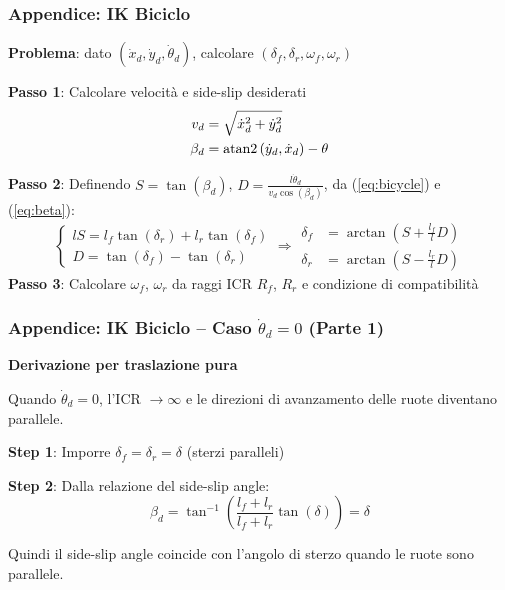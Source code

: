 \begin{frame}
    \frametitle{Appendice: IK Biciclo}
    \textbf{Problema}: dato $(\dot{x}_d, \dot{y}_d, \dot{\theta}_d)$, calcolare $(\delta_f, \delta_r, \omega_f, \omega_r)$

    \vspace{0.3cm}

    \textbf{Passo 1}: Calcolare velocità e side-slip desiderati
    \begin{align}
        v_d     & = \sqrt{\dot{x}_d^2 + \dot{y}_d^2}       \\
        \beta_d & = \operatorname{atan2}\left(\dot{y}_d,\dot{x}_d\right) - \theta
    \end{align}

    \textbf{Passo 2}: Definendo $S = \tan(\beta_d)$, $D = \frac{l\dot{\theta}_d}{v_d \cos(\beta_d)}$, da (\ref{eq:bicycle}) e (\ref{eq:beta}):
    \begin{equation}
        \begin{cases}
            lS = l_f \tan(\delta_r) + l_r \tan(\delta_f) \\
            D = \tan(\delta_f) - \tan(\delta_r)
        \end{cases}\Rightarrow
        \begin{aligned}
            \delta_f & = \arctan\left(S + \frac{l_f}{l} D\right) \\
            \delta_r & = \arctan\left(S - \frac{l_r}{l} D\right)
        \end{aligned}
    \end{equation}
    \textbf{Passo 3}: Calcolare $\omega_f$, $\omega_r$ da raggi ICR $R_f$, $R_r$ e condizione di compatibilità
\end{frame}
\begin{frame}
    \frametitle{Appendice: IK Biciclo -- Caso $\dot{\theta}_d = 0$ (Parte 1)}
    \textbf{Derivazione per traslazione pura}

    \vspace{0.3cm}

    Quando $\dot{\theta}_d = 0$, l'ICR $\to \infty$ e le direzioni di avanzamento delle ruote diventano parallele.

    \vspace{0.3cm}

    \textbf{Step 1}: Imporre $\delta_f = \delta_r = \delta$ (sterzi paralleli)

    \vspace{0.3cm}

    \textbf{Step 2}: Dalla relazione del side-slip angle:
    \begin{equation}
        \beta_d = \tan^{-1}\left(\frac{l_f + l_r}{l_f + l_r}\tan(\delta)\right) = \delta
    \end{equation}

    \vspace{0.3cm}

    Quindi il side-slip angle coincide con l'angolo di sterzo quando le ruote sono parallele.
\end{frame}

